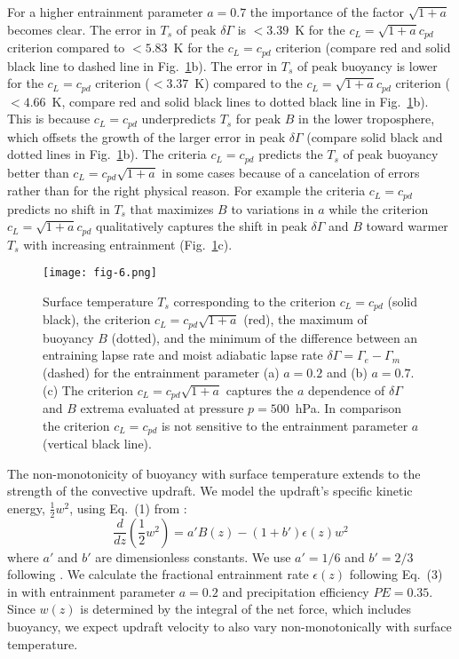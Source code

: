 \documentclass[draft,twocol]{ametsocV6.1}
\begin{document}
For a higher entrainment parameter $a=0.7$ the importance of the factor $\sqrt{1+a}$ becomes clear. The error in $T_s$ of peak $\delta \Gamma$ is $<3.39$~K for the $c_L=\sqrt{1+a}c_{pd}$ criterion compared to $<5.83$~K for the $c_L=c_{pd}$ criterion (compare red and solid black line to dashed line in Fig.~\ref{fig:fig-6}b). The error in $T_s$ of peak buoyancy is lower for the $c_L=c_{pd}$ criterion ($<3.37$~K) compared to the $c_L=\sqrt{1+a}c_{pd}$ criterion ($<4.66$~K, compare red and solid black lines to dotted black line in Fig.~\ref{fig:fig-6}b). This is because $c_L=c_{pd}$ underpredicts $T_s$ for peak $B$ in the lower troposphere, which offsets the growth of the larger error in peak $\delta \Gamma$ (compare solid black and dotted lines in Fig.~\ref{fig:fig-6}b). The criteria $c_L=c_{pd}$ predicts the $T_s$ of peak buoyancy better than $c_L=c_{pd}\sqrt{1+a}$ in some cases because of a cancelation of errors rather than for the right physical reason. For example the criteria $c_L=c_{pd}$ predicts no shift in $T_s$ that maximizes $B$ to variations in $a$ while the criterion $c_L=\sqrt{1+a}c_{pd}$ qualitatively captures the shift in peak $\delta \Gamma$ and $B$ toward warmer $T_s$ with increasing entrainment (Fig.~\ref{fig:fig-6}c).

\begin{figure}[htbp]
 \centering
 \texttt{[image: fig-6.png]}\\
 \caption{Surface temperature $T_s$ corresponding to the criterion $c_L=c_{pd}$ (solid black), the criterion $c_L=c_{pd}\sqrt{1+a}$ (red), the maximum of buoyancy $B$ (dotted), and the minimum of the difference between an entraining lapse rate and moist adiabatic lapse rate $\delta \Gamma = \Gamma_e - \Gamma_m$ (dashed) for the entrainment parameter (a) $a=0.2$ and (b) $a=0.7$. (c) The criterion $c_L=c_{pd}\sqrt{1+a}$ captures the $a$ dependence of $\delta \Gamma$ and $B$ extrema evaluated at pressure $p=500$~hPa. In comparison the criterion $c_L=c_{pd}$ is not sensitive to the entrainment parameter $a$ (vertical black line).}\label{fig:fig-6}
\end{figure}

The non-monotonicity of buoyancy with surface temperature extends to the strength of the convective updraft. We model the updraft's specific kinetic energy, $\frac{1}{2}w^2$, using Eq.~(1) from \cite{delgenio2007}:
\begin{equation}
\frac{d}{dz}\left(\frac{1}{2}w^2\right)=a'B(z)-(1+b')\epsilon(z)w^2 \label{eq:momentum}
\end{equation}
where $a'$ and $b'$ are dimensionless constants. We use $a'=1/6$ and $b'=2/3$ following \cite{delgenio2007}. We calculate the fractional entrainment rate $\epsilon(z)$ following Eq.~(3) in \cite{romps2016} with entrainment parameter $a=0.2$ and precipitation efficiency $PE=0.35$. Since $w(z)$ is determined by the integral of the net force, which includes buoyancy, we expect updraft velocity to also vary non-monotonically with surface temperature.
\end{document}
